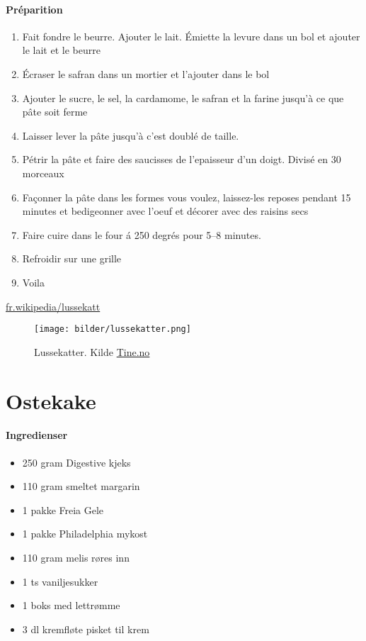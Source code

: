 \documentclass[12pt,a4paper]{book}
\begin{document}
\paragraph{Préparition}
\begin{enumerate}[noitemsep]
	\item Fait fondre le beurre. Ajouter le lait. Émiette la levure dans un bol et ajouter le lait et le beurre
	\item Écraser le safran dans un mortier et l'ajouter  dans le bol
	\item Ajouter le sucre, le sel, la cardamome, le safran et la farine jusqu'à ce que pâte soit ferme
	\item Laisser lever la pâte jusqu'à c'est doublé de taille.
	\item Pétrir la pâte et faire des saucisses de l'epaisseur d'un doigt. Divisé en 30 morceaux
	\item Façonner la pâte dans les formes vous voulez, laissez-les reposes pendant 15 minutes et bedigeonner avec l'oeuf et décorer avec des raisins secs
	\item Faire cuire dans le four á 250 degrés pour 5--8 minutes.
	\item Refroidir sur une grille
	\item Voila
\end{enumerate}


\href{https://fr.wikipedia.org/wiki/Lussekatt}{fr.wikipedia/lussekatt}


\begin{figure}[p]
	\texttt{[image: bilder/lussekatter.png]}
	\caption[Lussekatter]{Lussekatter. Kilde \href{http://www.tine.no/imageresize/383493_999_1150.png}{Tine.no}}
	\label{lussekatter}
\end{figure}
\clearpage{}
\clearpage{}\section{﻿Ostekake}


\paragraph{Ingredienser}
\begin{itemize}[noitemsep]
	\item 250 gram Digestive kjeks
	\item 110 gram smeltet margarin
	\item 1 pakke Freia Gele
	\item 1 pakke Philadelphia mykost
	\item 110 gram melis røres inn
	\item 1 ts vaniljesukker
	\item 1 boks med lettrømme
	\item 3 dl kremfløte pisket til krem
\end{itemize}
\end{document}
